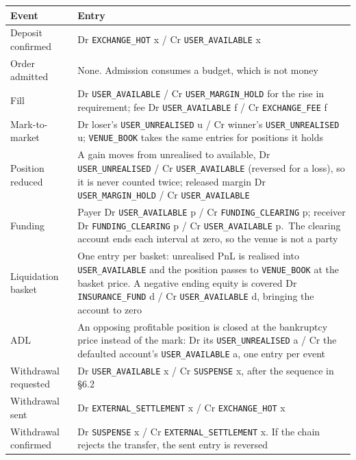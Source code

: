 \documentclass[10pt,a4paper]{article}
\newcounter{none}  %
\begin{document}
{\def\LTcaptype{none} %
\begin{longtable}[]{@{}
  >{\raggedright\arraybackslash}p{}
  >{\raggedright\arraybackslash}p{}@{}}
\toprule\noalign{}
\begin{minipage}[b]{\linewidth}\raggedright
Event
\end{minipage} & \begin{minipage}[b]{\linewidth}\raggedright
Entry
\end{minipage} \\
\midrule\noalign{}
\endhead
\bottomrule\noalign{}
\endlastfoot
Deposit confirmed & Dr \texttt{EXCHANGE\_HOT} x / Cr \texttt{USER\_AVAILABLE} x \\
Order admitted & None. Admission consumes a budget, which is not money \\
Fill & Dr \texttt{USER\_AVAILABLE} / Cr \texttt{USER\_MARGIN\_HOLD} for the rise in requirement; fee Dr \texttt{USER\_AVAILABLE} f / Cr \texttt{EXCHANGE\_FEE} f \\
Mark-to-market & Dr loser's \texttt{USER\_UNREALISED} u / Cr winner's \texttt{USER\_UNREALISED} u; \texttt{VENUE\_BOOK} takes the same entries for positions it holds \\
Position reduced & A gain moves from unrealised to available, Dr \texttt{USER\_UNREALISED} / Cr \texttt{USER\_AVAILABLE} (reversed for a loss), so it is never counted twice; released margin Dr \texttt{USER\_MARGIN\_HOLD} / Cr \texttt{USER\_AVAILABLE} \\
Funding & Payer Dr \texttt{USER\_AVAILABLE} p / Cr \texttt{FUNDING\_CLEARING} p; receiver Dr \texttt{FUNDING\_CLEARING} p / Cr \texttt{USER\_AVAILABLE} p.~The clearing account ends each interval at zero, so the venue is not a party \\
Liquidation basket & One entry per basket: unrealised PnL is realised into \texttt{USER\_AVAILABLE} and the position passes to \texttt{VENUE\_BOOK} at the basket price. A negative ending equity is covered Dr \texttt{INSURANCE\_FUND} d / Cr \texttt{USER\_AVAILABLE} d, bringing the account to zero \\
ADL & An opposing profitable position is closed at the bankruptcy price instead of the mark: Dr its \texttt{USER\_UNREALISED} a / Cr the defaulted account's \texttt{USER\_AVAILABLE} a, one entry per event \\
Withdrawal requested & Dr \texttt{USER\_AVAILABLE} x / Cr \texttt{SUSPENSE} x, after the sequence in §6.2 \\
Withdrawal sent & Dr \texttt{EXTERNAL\_SETTLEMENT} x / Cr \texttt{EXCHANGE\_HOT} x \\
Withdrawal confirmed & Dr \texttt{SUSPENSE} x / Cr \texttt{EXTERNAL\_SETTLEMENT} x. If the chain rejects the transfer, the sent entry is reversed \\
\end{longtable}
}
\end{document}
